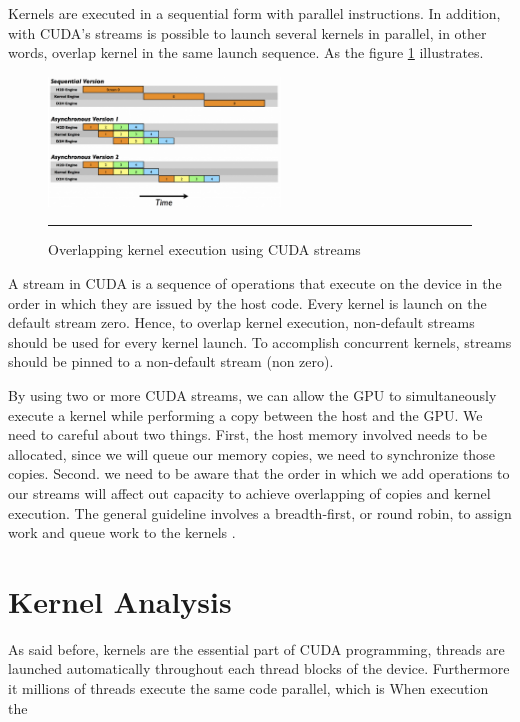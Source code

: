 Kernels are executed in a sequential form with parallel instructions. In addition, with CUDA's streams is possible to launch several kernels in parallel, in other words, overlap kernel in the same launch sequence. As the figure \ref{fig:streams} illustrates.

\begin{figure}[htbp]
	\centering
		\includegraphics[width=0.55\textwidth]{Figures/streams.png}
		\rule{35em}{0.5pt}
	\caption[Concurrent Kernels]{Overlapping kernel execution using CUDA streams}
	\label{fig:streams}
\end{figure}

A stream in CUDA is a sequence of operations that execute on the device in the order in which they are issued by the host code. Every kernel is launch on the default stream zero. Hence, to overlap kernel execution, non-default streams should be used for every kernel launch. To accomplish concurrent kernels, streams should be pinned to a non-default stream (non zero)\cite{hwu}. 

By using two or more CUDA streams, we can allow the GPU to simultaneously execute a kernel while performing a copy between the host and the GPU. We need to careful about two things. First, the host memory involved needs to be allocated, since we will queue our memory copies, we need to synchronize those copies. Second. we need to be aware that the order in which we add operations to our streams will affect out capacity to achieve overlapping of copies and kernel execution. The general guideline involves a breadth-first, or round robin, to assign work and queue work to the kernels \cite{example}.

\section{Kernel Analysis}

As said before, kernels are the essential part of CUDA programming, threads are launched automatically throughout each thread blocks of the device. Furthermore it millions of threads execute the same code parallel, which is  When execution the 

